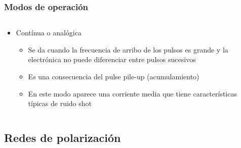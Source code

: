 \documentclass{beamer}
\begin{document}
\begin{frame}
\frametitle{Modos de operaci\'on}
\begin{columns}
\begin{column}{0.60\textwidth}
\begin{block}{}
\begin{itemize}

\item Cont\'inua o anal\'ogica 
\begin{itemize}
\item Se da cuando la frecuencia de arribo de los pulsos es grande y la
electr\'onica no puede diferenciar entre pulsos sucesivos 
\item Es una consecuencia del pulse pile-up (acumulamiento)
\item En este modo aparece una corriente media que tiene caracter\'isticas
t\'ipicas de ruido shot
\end{itemize}
\end{itemize}
\end{block}
\end{column} 
\begin{column}{0.40\textwidth}
\begin{center}
\end{center}
\end{column}
\end{columns}
\end{frame} 

\subsection{Redes de polarizaci\'on}
\end{document}
